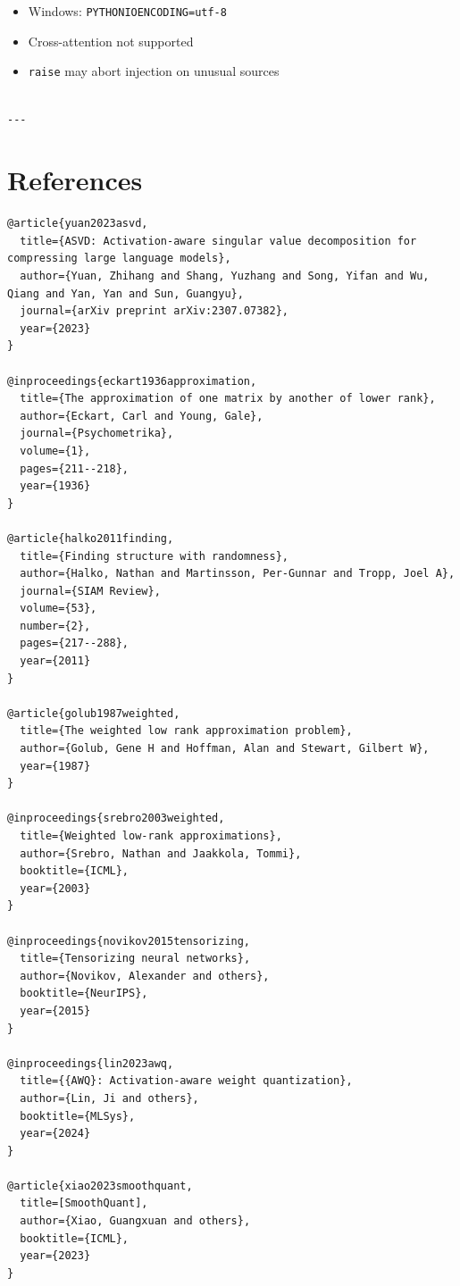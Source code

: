 \begin{itemize}
\item Windows: \texttt{PYTHONIOENCODING=utf-8}
\item Cross-attention not supported
\item \texttt{raise} may abort injection on unusual sources
\end{itemize}
\begin{lstlisting}

---
\end{lstlisting}


\section{References}

\begin{lstlisting}
@article{yuan2023asvd,
  title={ASVD: Activation-aware singular value decomposition for compressing large language models},
  author={Yuan, Zhihang and Shang, Yuzhang and Song, Yifan and Wu, Qiang and Yan, Yan and Sun, Guangyu},
  journal={arXiv preprint arXiv:2307.07382},
  year={2023}
}

@inproceedings{eckart1936approximation,
  title={The approximation of one matrix by another of lower rank},
  author={Eckart, Carl and Young, Gale},
  journal={Psychometrika},
  volume={1},
  pages={211--218},
  year={1936}
}

@article{halko2011finding,
  title={Finding structure with randomness},
  author={Halko, Nathan and Martinsson, Per-Gunnar and Tropp, Joel A},
  journal={SIAM Review},
  volume={53},
  number={2},
  pages={217--288},
  year={2011}
}

@article{golub1987weighted,
  title={The weighted low rank approximation problem},
  author={Golub, Gene H and Hoffman, Alan and Stewart, Gilbert W},
  year={1987}
}

@inproceedings{srebro2003weighted,
  title={Weighted low-rank approximations},
  author={Srebro, Nathan and Jaakkola, Tommi},
  booktitle={ICML},
  year={2003}
}

@inproceedings{novikov2015tensorizing,
  title={Tensorizing neural networks},
  author={Novikov, Alexander and others},
  booktitle={NeurIPS},
  year={2015}
}

@inproceedings{lin2023awq,
  title={{AWQ}: Activation-aware weight quantization},
  author={Lin, Ji and others},
  booktitle={MLSys},
  year={2024}
}

@article{xiao2023smoothquant,
  title=[SmoothQuant],
  author={Xiao, Guangxuan and others},
  booktitle={ICML},
  year={2023}
}


\end{lstlisting}

